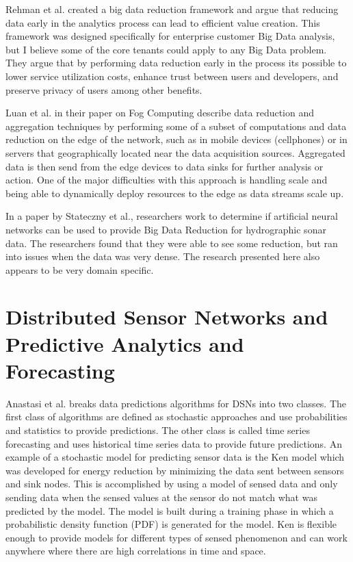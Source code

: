 Rehman et al. created a big data reduction framework\cite{ur2016big} and argue that reducing data early in the analytics process can lead to efficient value creation. This framework was designed specifically for enterprise customer Big Data analysis, but I believe some of the core tenants could apply to any Big Data problem. They argue that by performing data reduction early in the process its possible to lower service utilization costs, enhance trust between users and developers, and preserve privacy of users among other benefits. 

Luan et al. in their paper on Fog Computing\cite{luan2015fog} describe data reduction and aggregation techniques by performing some of a subset of computations and data reduction on the edge of the network, such as in mobile devices (cellphones) or in servers that geographically located near the data acquisition sources. Aggregated data is then send from the edge devices to data sinks for further analysis or action. One of the major difficulties with this approach is handling scale and being able to dynamically deploy resources to the edge as data streams scale up.

In a paper by Stateczny et al.\cite{stateczny2014self}, researchers work to determine if artificial neural networks can be used to provide Big Data Reduction for hydrographic sonar data. The researchers found that they were able to see some reduction, but ran into issues when the data was very dense. The research presented here also appears to be very domain specific.

\section{Distributed Sensor Networks and Predictive Analytics and Forecasting}
Anastasi et al.\cite{anastasi_energy_2009} breaks data predictions algorithms for DSNs into two classes. The first class of algorithms are defined as stochastic approaches and use probabilities and statistics to provide predictions. The other class is called time series forecasting and uses historical time series data to provide future predictions. An example of a stochastic model for predicting sensor data is the Ken model\cite{chu2006approximate} which was developed for energy reduction by minimizing the data sent between sensors and sink nodes. This is accomplished by using a model of sensed data and only sending data when the sensed values at the sensor do not match what was predicted by the model. The model is built during a training phase in which a probabilistic density function (PDF) is generated for the model. Ken is flexible enough to provide models for different types of sensed phenomenon and can work anywhere where there are high correlations in time and space.

